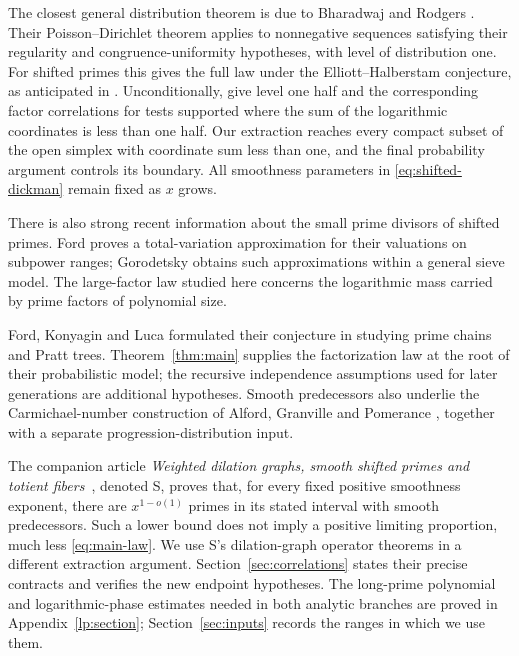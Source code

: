 The closest general distribution theorem is due to Bharadwaj and
Rodgers \cite[Theorem~7]{BharadwajRodgers2026}. Their
Poisson--Dirichlet theorem applies to nonnegative sequences satisfying
their regularity and congruence-uniformity hypotheses, with level of
distribution one. For shifted primes this gives the
full law under the Elliott--Halberstam conjecture, as anticipated in
\cite[Section~6]{FordKonyaginLuca2010}. Unconditionally,
\cite[Proposition~2 and Lemma~8]{BharadwajRodgers2026} give level
one half and the corresponding factor correlations for tests supported
where the sum of the logarithmic coordinates is less than one half.
Our extraction reaches every compact subset of the open simplex with
coordinate sum less than one, and the final probability argument
controls its boundary. All smoothness parameters in
\eqref{eq:shifted-dickman} remain fixed as $x$ grows.

There is also strong recent information about the small prime
divisors of shifted primes. Ford \cite{Ford2025} proves a
total-variation approximation for their valuations on subpower ranges;
Gorodetsky \cite{Gorodetsky2026} obtains such approximations within
a general sieve model. The large-factor law studied here concerns
the logarithmic mass carried by prime factors of polynomial size.

Ford, Konyagin and Luca formulated their conjecture in studying
prime chains and Pratt trees. Theorem~\ref{thm:main} supplies the
factorization law at the root of their probabilistic model; the
recursive independence assumptions used for later generations are
additional hypotheses. Smooth predecessors also underlie the
Carmichael-number construction of Alford, Granville and Pomerance
\cite{AlfordGranvillePomerance1994}, together with a separate
progression-distribution input.

The companion article \emph{Weighted dilation graphs, smooth shifted
primes and totient fibers}~\cite[Theorem~1.2]{SmoothShifted}, denoted S, proves that, for every
fixed positive smoothness exponent, there are $x^{1-o(1)}$ primes
in its stated interval with smooth predecessors.  Such a lower
bound does not imply a positive limiting proportion, much less
\eqref{eq:main-law}. We use S's dilation-graph operator theorems in a
different extraction argument. Section~\ref{sec:correlations} states
their precise contracts and verifies the new endpoint hypotheses.
The long-prime polynomial and logarithmic-phase estimates needed in
both analytic branches are proved in Appendix~\ref{lp:section};
Section~\ref{sec:inputs} records the ranges in which we use them.

